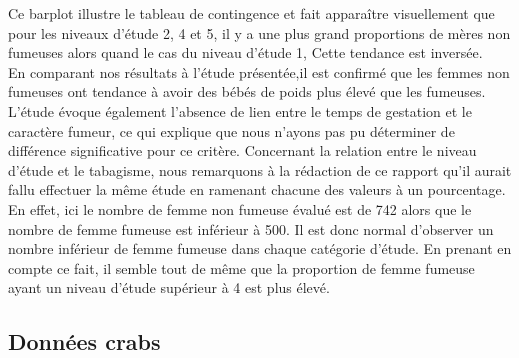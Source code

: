 \documentclass[a4paper, 8pt]{article}
\begin{document}
Ce barplot illustre le tableau de contingence et fait apparaître visuellement que pour les niveaux d'\'etude 2, 4 et 5, il y a une plus grand proportions de
m\`eres non fumeuses alors quand le cas du niveau d'\'etude 1, Cette tendance est inversée.\\
En comparant nos résultats à l'\'etude pr\'esent\'ee,il est confirmé que les femmes non fumeuses ont tendance à avoir des bébés de poids plus élevé que les fumeuses.\\
L’étude évoque également l’absence de lien entre le temps de gestation et le caractère fumeur, ce qui explique que nous n’ayons pas pu déterminer de différence significative pour ce critère.
Concernant la relation entre le niveau d'\'etude et le tabagisme, nous remarquons à la rédaction de ce rapport qu’il aurait fallu effectuer la même étude en ramenant chacune des valeurs à un pourcentage. En effet, ici le nombre de femme non fumeuse évalué est de 742 alors que le nombre de femme fumeuse est inférieur à 500. Il est donc normal d’observer un nombre inférieur de femme fumeuse dans chaque catégorie d’étude. En prenant en compte ce fait, il semble tout de même que la proportion de femme fumeuse ayant un niveau d’étude supérieur à 4 est plus élevé.
\newpage
\subsection{Données crabs}
\end{document}
